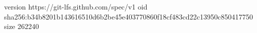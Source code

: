 version https://git-lfs.github.com/spec/v1
oid sha256:b34b8201b143616510d6b2be45e403770860f18cf483cd22c13950c850417750
size 262240
